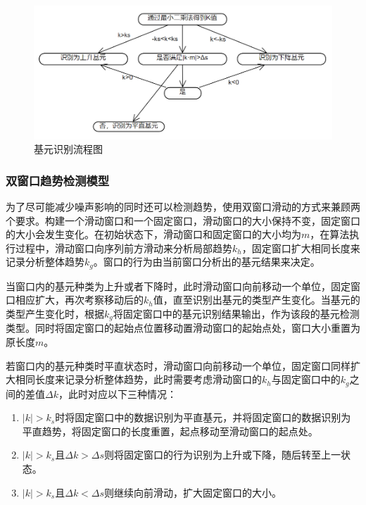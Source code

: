 \documentclass{my_paper}
\begin{document}
\begin {figure}[h]
\centering %
\includegraphics[width=\textwidth]{jiyuanz.png}
\caption{基元识别流程图} %
\label{jyz}
\end {figure}

\subsubsection{双窗口趋势检测模型}
为了尽可能减少噪声影响的同时还可以检测趋势，使用双窗口滑动的方式来兼顾两个要求。构建一个滑动窗口和一个固定窗口，滑动窗口的大小保持不变，固定窗口的大小会发生变化。在初始状态下，滑动窗口和固定窗口的大小均为$m$，在算法执行过程中，滑动窗口向序列前方滑动来分析局部趋势$k_h$，固定窗口扩大相同长度来记录分析整体趋势$k_g$。窗口的行为由当前窗口分析出的基元结果来决定。

当窗口内的基元种类为上升或者下降时，此时滑动窗口向前移动一个单位，固定窗口相应扩大，再次考察移动后的$k_h$值，直至识别出基元的类型产生变化。当基元的类型产生变化时，根据$k_g$将固定窗口中的基元识别结果输出，作为该段的基元检测类型。同时将固定窗口的起始点位置移动置滑动窗口的起始点处，窗口大小重置为原长度$m$。

若窗口内的基元种类时平直状态时，滑动窗口向前移动一个单位，固定窗口同样扩大相同长度来记录分析整体趋势，此时需要考虑滑动窗口的$k_h$与固定窗口中的$k_g$之间的差值$\Delta k$，此时对应以下三种情况：

\begin{enumerate}
    \item $|k|>k_s$时将固定窗口中的数据识别为平直基元，并将固定窗口的数据识别为平直趋势，将固定窗口的长度重置，起点移动至滑动窗口的起点处。
    \item $|k|>k_s$且$\Delta k > \Delta s$则将固定窗口的行为识别为上升或下降，随后转至上一状态。
    \item $|k|>k_s$且$\Delta k < \Delta s$则继续向前滑动，扩大固定窗口的大小。
\end{enumerate}
\end{document}
